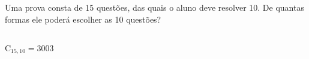 \begin{ex}
 Uma prova consta de 15 questões, das quais o aluno deve resolver 10. De quantas formas ele poderá escolher as 10 questões?
 
 \begin{sol}
     \phantom{A} \\
 $\mathrm{C}_{{15},{10}} = 3003$
 \end{sol}
\end{ex}